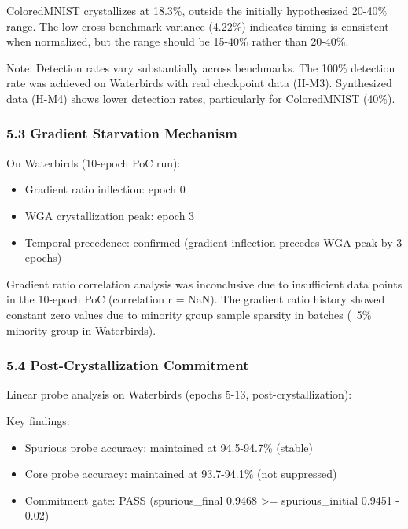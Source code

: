 ColoredMNIST crystallizes at 18.3\%, outside the initially hypothesized 20-40\% range. The low cross-benchmark variance (4.22\%) indicates timing is consistent when normalized, but the range should be 15-40\% rather than 20-40\%.

Note: Detection rates vary substantially across benchmarks. The 100\% detection rate was achieved on Waterbirds with real checkpoint data (H-M3). Synthesized data (H-M4) shows lower detection rates, particularly for ColoredMNIST (40\%).

\subsubsection{5.3 Gradient Starvation Mechanism}

On Waterbirds (10-epoch PoC run):
\begin{itemize}
\item Gradient ratio inflection: epoch 0
\item WGA crystallization peak: epoch 3
\item Temporal precedence: confirmed (gradient inflection precedes WGA peak by 3 epochs)
\end{itemize}

Gradient ratio correlation analysis was inconclusive due to insufficient data points in the 10-epoch PoC (correlation r = NaN). The gradient ratio history showed constant zero values due to minority group sample sparsity in batches (~5\% minority group in Waterbirds).

\subsubsection{5.4 Post-Crystallization Commitment}

Linear probe analysis on Waterbirds (epochs 5-13, post-crystallization):

\begin{table}[htbp]
\centering
{}
\end{table}

Key findings:
\begin{itemize}
\item Spurious probe accuracy: maintained at 94.5-94.7\% (stable)
\item Core probe accuracy: maintained at 93.7-94.1\% (not suppressed)
\item Commitment gate: PASS (spurious\_final 0.9468 >= spurious\_initial 0.9451 - 0.02)
\end{itemize}

